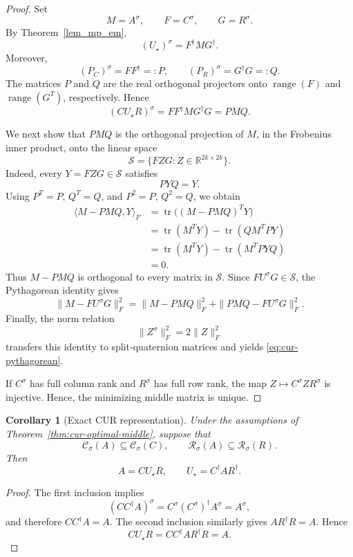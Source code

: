 \documentclass[12pt,a4paper]{article}
\theoremstyle{plain}
\newtheorem{corollary}[theorem]{Corollary}
\theoremstyle{definition}
\theoremstyle{remark}
\begin{document}
\begin{proof}
Set
\[
    M=A^\sigma,\qquad F=C^\sigma,\qquad G=R^\sigma.
\]
By Theorem~\ref{lem_mp_em},
\[
    (U_\star)^\sigma = F^\dagger M G^\dagger.
\]
Moreover,
\[
    (P_C)^\sigma=FF^\dagger=:P, \qquad  (P_R)^\sigma=G^\dagger G=:Q.
\]
The matrices \(P\) and \(Q\) are the real orthogonal projectors onto \(\operatorname{range}(F)\) and \(\operatorname{range}(G^T)\), respectively. Hence
\[
    (CU_\star R)^\sigma = FF^\dagger M G^\dagger G = PMQ.
\]

We next show that \(PMQ\) is the orthogonal projection of \(M\), in the Frobenius inner product, onto the linear space
\[
    \mathcal{S} = \{FZG:Z\in\mathbb{R}^{2k\times 2k}\}.
\]
Indeed, every \(Y=FZG\in\mathcal{S}\) satisfies
\[
    PYQ=Y.
\]
Using \(P^T=P\), \(Q^T=Q\), and \(P^2=P\), \(Q^2=Q\), we obtain
\[
\begin{aligned}
    \langle M-PMQ,Y \rangle_F
    &= \operatorname{tr}\bigl((M-PMQ)^T Y\bigr)\\
    &=\operatorname{tr}(M^T Y) - \operatorname{tr}(Q M^T P Y)\\
    &= \operatorname{tr}(M^T Y) - \operatorname{tr}(M^T P Y Q)\\
    &=0.
\end{aligned}
\]
Thus \(M-PMQ\) is orthogonal to every matrix in \(\mathcal{S}\).  Since \(F U^\sigma G\in\mathcal{S}\), the Pythagorean identity gives
\[
    \|M-FU^\sigma G\|_F^2 = \|M-PMQ\|_F^2 + \|PMQ-FU^\sigma G\|_F^2.
\]
Finally, the norm relation
\[
    \|Z^\sigma\|_F^2=2\|Z\|_F^2
\]
transfers this identity to split-quaternion matrices and yields
\eqref{eq:cur-pythagorean}.

If \(C^\sigma\) has full column rank and \(R^\sigma\) has full row rank, the map \(Z\mapsto C^\sigma ZR^\sigma\) is injective. Hence, the minimizing middle matrix is unique.
\end{proof}

\begin{corollary}[Exact CUR representation]\label{cor:cur-exact-ranges}
Under the assumptions of Theorem~\ref{thm:cur-optimal-middle}, suppose that
\[
    \mathcal{C}_{\sigma}(A) \subseteq \mathcal{C}_{\sigma}(C), \qquad \mathcal{R}_{\sigma}(A) \subseteq \mathcal{R}_{\sigma}(R).
\]
Then
\[
    A=C U_\star R, \qquad U_\star=C^\dagger A R^\dagger.
\]
\end{corollary}

\begin{proof}
The first inclusion implies
\[
    (CC^\dagger A)^\sigma = C^\sigma(C^\sigma)^\dagger A^\sigma = A^\sigma,
\]
and therefore \(CC^\dagger A=A\). The second inclusion similarly gives \(AR^\dagger R=A\). Hence
\[
    CU_\star R = CC^\dagger A R^\dagger R = A.
\]
\end{proof}
\end{document}
